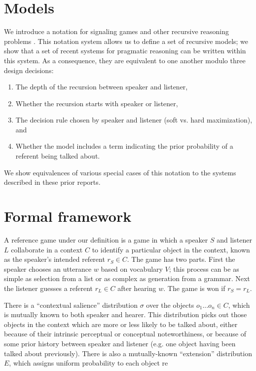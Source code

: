 \section{Models}

We introduce a notation for signaling games and other recursive reasoning problems \cite{golland2010,franke2012,frank2012}. This notation system allows us to define a set of recursive models; we show that a set of recent systems for pragmatic reasoning can be written within this system. As a consequence, they are equivalent to one another modulo three design decisions: 

\begin{enumerate}
\item The depth of the recursion between speaker and listener,
\item Whether the recursion starts with speaker or listener,
\item The decision rule chosen by speaker and listener (soft vs. hard maximization), and 
\item Whether the model includes a term indicating the prior probability of a referent being talked about.
\end{enumerate}

\noindent We show equivalences of various special cases of this notation to the systems described in these prior reports.

\section{Formal framework}

A reference game under our definition is a game in which a speaker $S$ and listener $L$ collaborate in a context $C$ to identify a particular object in the context, known as the speaker's intended referent $r_S \in C$. The game has two parts. First the speaker chooses an utterance $w$ based on vocabulary $V$; this process can be as simple as selection from a list or as complex as generation from a grammar. Next the listener guesses a referent $r_L \in C$ after hearing $w$. The game is won if $r_S=r_L$.

There is a ``contextual salience'' distribution $\sigma$ over the objects ${o_1 ... o_n} \in C$, which is mutually known to both speaker and hearer. This distribution picks out those objects in the context which are more or less likely to be talked about, either because of their intrinsic perceptual or conceptual noteworthiness, or because of some prior history between speaker and listener (e.g. one object having been talked about previously). There is also a mutually-known ``extension'' distribution $E$, which assigns uniform probability to each object re

